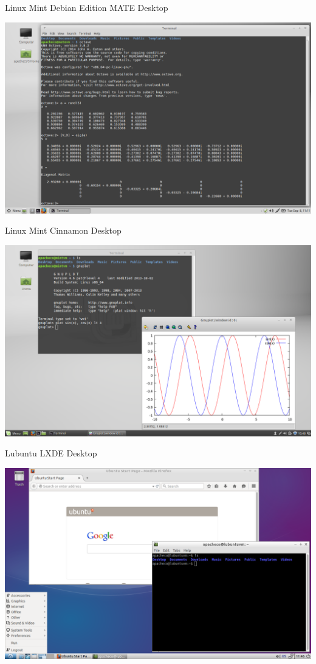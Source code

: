 \documentclass[10pt,t]{beamer}
\begin{document}
\begin{frame}{Linux Mint Debian Edition MATE Desktop}
  \begin{center}
    \includegraphics[width=\textwidth]{./mate}
  \end{center}
\end{frame}
\begin{frame}{Linux Mint Cinnamon Desktop}
  \begin{center}
    \includegraphics[width=\textwidth]{./mint}
  \end{center}
\end{frame}
\begin{frame}{Lubuntu LXDE Desktop}
  \begin{center}
    \includegraphics[width=\textwidth]{./lubuntu}
  \end{center}
\end{frame}
\end{document}
